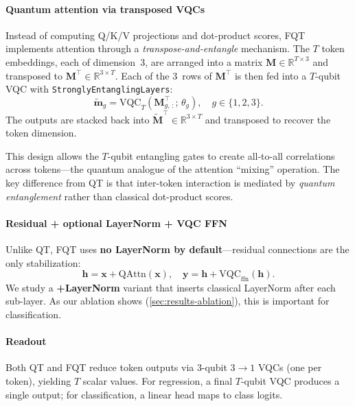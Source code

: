 \documentclass[10pt,conference]{IEEEtran}
\begin{document}
\paragraph{Quantum attention via transposed VQCs}
Instead of computing Q/K/V projections and dot-product scores, FQT implements attention through a \emph{transpose-and-entangle} mechanism.
The $T$ token embeddings, each of dimension~3, are arranged into a matrix $\mathbf{M} \in \mathbb{R}^{T \times 3}$ and transposed to $\mathbf{M}^\top \in \mathbb{R}^{3 \times T}$.
Each of the 3~rows of $\mathbf{M}^\top$ is then fed into a $T$-qubit VQC with \texttt{StronglyEntanglingLayers}:
\begin{equation}
    \tilde{\mathbf{m}}_g = \mathrm{VQC}_{T}(\mathbf{M}^\top_{g,\,:};\, \theta_g), \quad g \in \{1,2,3\}.
\end{equation}
The outputs are stacked back into $\tilde{\mathbf{M}}^\top \in \mathbb{R}^{3 \times T}$ and transposed to recover the token dimension.

This design allows the $T$-qubit entangling gates to create all-to-all correlations across tokens---the quantum analogue of the attention ``mixing'' operation.
The key difference from QT is that inter-token interaction is mediated by \emph{quantum entanglement} rather than classical dot-product scores.

\paragraph{Residual + optional LayerNorm + VQC FFN}
Unlike QT, FQT uses \textbf{no LayerNorm by default}---residual connections are the only stabilization:
\begin{equation}
    \mathbf{h} = \mathbf{x} + \mathrm{QAttn}(\mathbf{x}), \quad
    \mathbf{y} = \mathbf{h} + \mathrm{VQC}_{\mathrm{ffn}}(\mathbf{h}).
\end{equation}
We study a \textbf{+LayerNorm} variant that inserts classical LayerNorm after each sub-layer.
As our ablation shows (\cref{sec:results-ablation}), this is important for classification.

\paragraph{Readout}
Both QT and FQT reduce token outputs via 3-qubit $3{\to}1$ VQCs (one per token), yielding $T$ scalar values.
For regression, a final $T$-qubit VQC produces a single output; for classification, a linear head maps to class logits.
\end{document}
